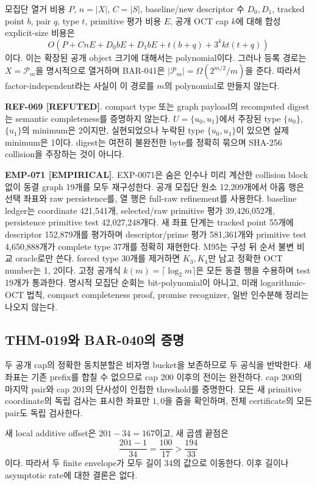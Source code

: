 \documentclass[11pt]{article}
\newcommand{\claimstatus}[2]{\textbf{#1 [#2]}}
\begin{document}
모집단 열거 비용 \(P\), \(n=|X|\), \(C=|S|\), baseline/new descriptor 수
\(D_0,D_1\), tracked point \(b\), pair \(q\), type \(t\), primitive 평가
비용 \(E\), 공개 OCT cap \(k\)에 대해 합성 explicit-size 비용은
\[
 O\!\left(
 P+CnE+D_0bE+D_1bE+t(b+q)+3^kkt(t+q)
 \right)
\]
이다. 이는 확장된 공개 object 크기에 대해서는 polynomial이다. 그러나
등록 경로는 \(X=\mathcal P_m\)을 명시적으로 열거하며 BAR-041은
\(|\mathcal P_m|=\Omega(2^{m/2}/m)\)을 준다. 따라서
factor-independent라는 사실이 이 경로를 \(m\)의 polynomial로 만들지
않는다.

\claimstatus{REF-069}{REFUTED}. compact type 또는 graph payload의
recomputed digest는 semantic completeness를 증명하지 않는다.
\(U=\{u_0,u_1\}\)에서 주장된 type \(\{u_0\}\), \(\{u_1\}\)의
minimum은 2이지만, 실현되었으나 누락된 type \(\{u_0,u_1\}\)이 있으면
실제 minimum은 1이다. digest는 여전히 불완전한 byte를 정확히 묶으며
SHA-256 collision을 주장하는 것이 아니다.

\claimstatus{EMP-071}{EMPIRICAL}. EXP-0071은 숨은 인수나 미리 계산한
collision block 없이 동결 graph 19개를 모두 재구성한다. 공개 모집단
원소 12,209개에서 아홉 행은 선택 좌표와 raw persistence를, 열 행은
full-raw refinement를 사용한다. baseline ledger는 coordinate 421,541개,
selected/raw primitive 평가 39,426,052개, persistence primitive test
42,027,248개다. 새 좌표 단계는 tracked point 55개에 descriptor
152,879개를 평가하며 descriptor/prime 평가 581,361개와 primitive test
4,650,888개가 complete type 37개를 정확히 재현한다. M95는 구성 뒤
순서 불변 비교 oracle로만 쓴다. forced type 30개를 제거하면
\(K_3,K_4\)만 남고 정확한 OCT number는 1, 2이다. 고정 공개식
\(k(m)=\lceil\log_2m\rceil\)은 모든 동결 행을 수용하며 test 19개가
통과한다. 명시적 모집단 순회는 bit-polynomial이 아니고, 미래
logarithmic-OCT 법칙, compact completeness proof, promise recognizer,
일반 인수분해 정리는 나오지 않는다.

\subsection{THM-019와 BAR-040의 증명}

두 공개 cap의 정확한 동치분할은 비자명 bucket을 보존하므로 두 공식을
반박한다. 새 좌표는 기존 prefix를 합칠 수 없으므로 cap 200 이후의
전이는 완전하다. cap 200의 마지막 pair와 cap 201의 단사성이 인접한
threshold를 증명한다. 모든 새 primitive coordinate의 독립 검사는
표시한 좌표만 \(1,0\)을 줌을 확인하며, 전체 certificate의 모든 pair도
독립 검사한다.

새 local additive offset은 \(201-34=167\)이고, 새 곱셈 끝점은
\[
\frac{201-1}{34}=\frac{100}{17}>\frac{194}{33}
\]
이다. 따라서 두 finite envelope가 모두 길이 34의 값으로 이동한다.
이후 길이나 asymptotic rate에 대한 결론은 없다.
\end{document}
